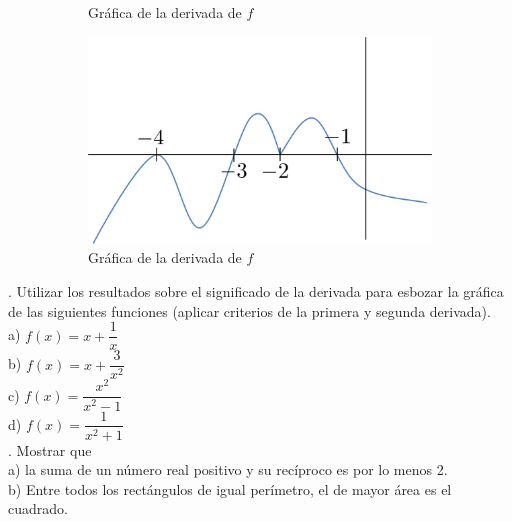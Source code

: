 \documentclass[letterpaper]{article}
\begin{document}
\begin{figure}[ht]
\begin{subfigure}[l]{0.4\paperwidth}
			\caption{Gráfica de la derivada de $ f $}
		\end{subfigure}
		\vspace{1cm}
		\begin{subfigure}[r]{0.4\textwidth}
			\includegraphics[scale=1]{img/imCuatro}
			\caption{Gráfica de la derivada de $ f $}
		\end{subfigure}
	\caption{ }
	\end{figure}

. Utilizar los resultados sobre el significado de la derivada para esbozar la gráfica de las siguientes funciones (aplicar criterios de la primera y segunda derivada).\\

a) $ f(x) = x + \dfrac{1}{x} $\\


b) $ f(x) = x + \dfrac{3}{x^{2}} $\\


c) $ f(x) = \dfrac{x^{2}}{x^{2}-1} $\\


d) $ f(x) = \dfrac{1}{x^{2} + 1} $\\


. Mostrar que\\

a) la suma de un número real positivo y su recíproco es por lo menos 2.\\


b) Entre todos los rectángulos de igual perímetro, el de mayor área es el cuadrado.\\
\end{document}
